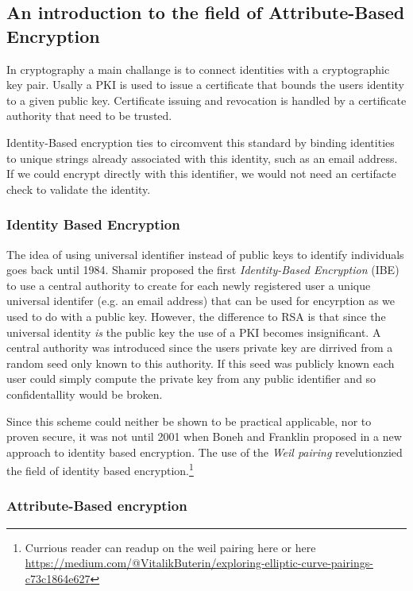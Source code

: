 \subsection{An introduction to the field of Attribute-Based Encryption}
In cryptography a main challange is to connect identities with a cryptographic key pair. Usally a PKI is used to issue a certificate that bounds the users identity to a given public key. Certificate issuing and revocation is handled by a certificate authority that need to be trusted. 

Identity-Based encryption ties to circomvent this standard by binding identities to unique strings already associated with this identity, such as an email address. If we could encrypt directly with this identifier, we would not need an certifacte check to validate the identity. 

\subsubsection{Identity Based Encryption}
The idea of using universal identifier instead of public keys to identify individuals goes back until 1984. Shamir proposed the first \textit{Identity-Based Encryption} (IBE) \cite{shamir1984identity} to use a central authority to create for each newly registered user a unique universal identifer (e.g. an email address) that can be used for encyrption as we used to do with a public key. However, the difference to RSA is that since the universal identity \textit{is} the public key the use of a PKI becomes insignificant. A central authority was introduced since the users private key are dirrived from a random seed only known to this authority. If this seed was publicly known each user could simply compute the private key from any public identifier and so confidentallity would be broken. 

Since this scheme could neither be shown to be practical applicable, nor to proven secure, it was not until 2001 when Boneh and Franklin proposed in \cite{boneh2001identity} a new approach to identity based encryption. The use of the \textit{Weil pairing} revelutionzied the field of identity based encryption.\footnote{Currious reader can readup on the weil pairing here \cite{Miller2004} \cite{galbraith2008pairings} or here \url{https://medium.com/@VitalikButerin/exploring-elliptic-curve-pairings-c73c1864e627}} 

\subsubsection{Attribute-Based encryption}

